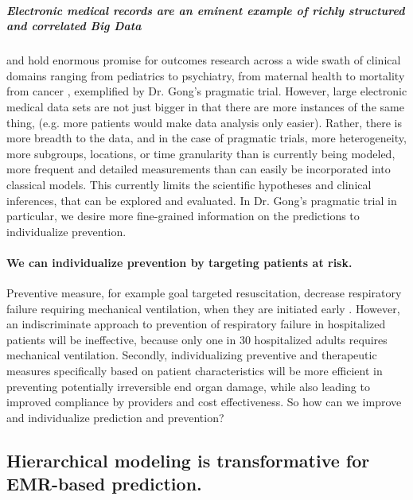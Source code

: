 \documentclass[11pt,notitlepage]{article}
\begin{document}
\subparagraph{Electronic medical records are an eminent example of richly structured and correlated Big Data} 
and hold enormous promise for outcomes research across a wide swath of clinical domains ranging from pediatrics to psychiatry, from maternal health to mortality from cancer \cite{Dean_19279318,Amarasingham20940649,Welch24782349,Smeeth_15602021,Dave_20819960,Man_23272239}, exemplified by Dr. Gong's pragmatic trial. However, large electronic medical data sets are not just bigger in that there are more instances of the same thing, (e.g. more patients would make data analysis only easier).  Rather, there is more breadth to the data, and in the case of pragmatic trials, more heterogeneity, more subgroups, locations, or time granularity than is currently being modeled, more frequent and detailed measurements than can easily be incorporated into classical models.  This currently limits the scientific hypotheses and clinical inferences, that can be explored and evaluated. In Dr. Gong's pragmatic trial in particular, we desire more fine-grained information on the predictions to individualize prevention.  

\paragraph*{We can individualize prevention by targeting patients at risk.}
Preventive measure, for example goal targeted resuscitation, decrease respiratory failure requiring mechanical ventilation, when they are initiated early \cite{Rivers_12594312}. However, an indiscriminate approach to prevention of respiratory failure in hospitalized patients will be ineffective, because only one in 30 hospitalized adults requires mechanical ventilation. Secondly, individualizing preventive and therapeutic measures specifically based on patient characteristics will be more efficient in preventing potentially irreversible end organ damage, while also  leading to improved compliance by providers and cost effectiveness. So how can we improve and individualize prediction and prevention? 

\subsection*{Hierarchical modeling is transformative for EMR-based prediction.}
\end{document}
